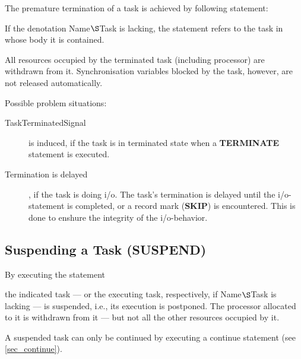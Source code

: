The premature termination of a task is achieved by following
statement:



If the denotation Name$\S $Task is lacking, the statement refers to
the task in whose body it is contained.

All resources occupied by the terminated task (including processor) are
withdrawn from it. Synchronisation variables blocked by the task,
however, are not released automatically.

Possible problem situations:
\begin{description}
\item[TaskTerminatedSignal] is induced, if the task is in terminated state
 when a {\bf TERMINATE} statement is executed.
\item[Termination is delayed], if the task is doing i/o. The task's termination
is delayed until the i/o-statement is completed, or a record mark ({\bf SKIP}) 
is encountered.  This is done to enshure the integrity of the i/o-behavior.
\end{description}

\subsection{Suspending a Task (SUSPEND)}   %
\label{sec_suspend}

By executing the statement



the indicated task --- or the executing task, respectively, if
Name$\S $Task is lacking --- is suspended, i.e., its execution is
postponed. The processor allocated to it is withdrawn from it --- but
not all the other resources occupied by it.

A suspended task can only be continued by executing a continue
statement (see \ref{sec_continue}).


